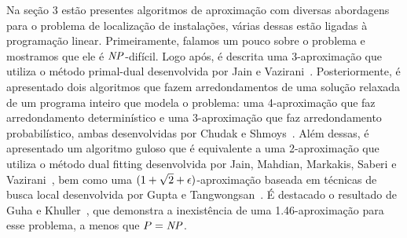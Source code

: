 \documentclass[12pt]{article}
\begin{document}
Na seção 3 estão presentes algoritmos de aproximação com diversas abordagens para o problema de localização de instalações, várias dessas estão ligadas à programação linear. Primeiramente, falamos um pouco sobre o problema e mostramos que ele é $\mathit{NP}$-difícil. Logo após, é descrita uma 3-aproximação que utiliza o método primal-dual desenvolvida por Jain e Vazirani~\cite{JV}. Posteriormente, é apresentado dois algoritmos que fazem arredondamentos de uma solução relaxada de um programa inteiro que modela o problema: uma 4-aproximação que faz arredondamento determinístico e uma 3-aproximação que faz arredondamento probabilístico, ambas desenvolvidas por Chudak e Shmoys~\cite{Chudak2003}. Além dessas, é apresentado um algoritmo guloso que é equivalente a uma 2-aproximação que utiliza o método dual fitting desenvolvida por Jain, Mahdian, Markakis, Saberi e Vazirani~\cite{jain2002greedy}, bem como uma $(1 + \sqrt{2} + \epsilon)$-aproximação baseada em técnicas de busca local desenvolvida por Gupta e Tangwongsan~\cite{DBLP:journals/corr/abs-0809-2554}. É destacado o resultado de Guha e Khuller~\cite{GUHA1999228}, que demonstra a inexistência de uma 1.46-aproximação para esse problema, a menos que $P=\mathit{NP}$.
\end{document}
